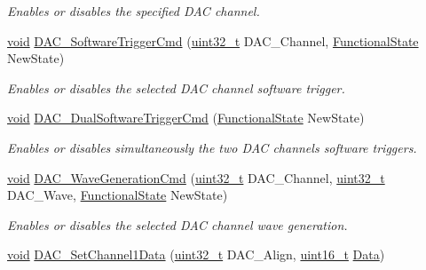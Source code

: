 \begin{DoxyCompactItemize}
\begin{DoxyCompactList}\small\item\em Enables or disables the specified D\-A\-C channel. \end{DoxyCompactList}\item 
\hyperlink{group___n_a_m_e_ga18028b8badbf1ea7e704ccac3c488e82}{void} \hyperlink{group___d_a_c___group1_ga46f9f7f6b9520a86e300fe966afe5fb3}{D\-A\-C\-\_\-\-Software\-Trigger\-Cmd} (\hyperlink{stdint_8h_a435d1572bf3f880d55459d9805097f62}{uint32\-\_\-t} D\-A\-C\-\_\-\-Channel, \hyperlink{group___exported__types_gac9a7e9a35d2513ec15c3b537aaa4fba1}{Functional\-State} New\-State)
\begin{DoxyCompactList}\small\item\em Enables or disables the selected D\-A\-C channel software trigger. \end{DoxyCompactList}\item 
\hyperlink{group___n_a_m_e_ga18028b8badbf1ea7e704ccac3c488e82}{void} \hyperlink{group___d_a_c___group1_gab4d3b364a6b184dcd65f3b294ebf56dc}{D\-A\-C\-\_\-\-Dual\-Software\-Trigger\-Cmd} (\hyperlink{group___exported__types_gac9a7e9a35d2513ec15c3b537aaa4fba1}{Functional\-State} New\-State)
\begin{DoxyCompactList}\small\item\em Enables or disables simultaneously the two D\-A\-C channels software triggers. \end{DoxyCompactList}\item 
\hyperlink{group___n_a_m_e_ga18028b8badbf1ea7e704ccac3c488e82}{void} \hyperlink{group___d_a_c___group1_gabd51ae6880821d4dcd923969ec19a19e}{D\-A\-C\-\_\-\-Wave\-Generation\-Cmd} (\hyperlink{stdint_8h_a435d1572bf3f880d55459d9805097f62}{uint32\-\_\-t} D\-A\-C\-\_\-\-Channel, \hyperlink{stdint_8h_a435d1572bf3f880d55459d9805097f62}{uint32\-\_\-t} D\-A\-C\-\_\-\-Wave, \hyperlink{group___exported__types_gac9a7e9a35d2513ec15c3b537aaa4fba1}{Functional\-State} New\-State)
\begin{DoxyCompactList}\small\item\em Enables or disables the selected D\-A\-C channel wave generation. \end{DoxyCompactList}\item 
\hyperlink{group___n_a_m_e_ga18028b8badbf1ea7e704ccac3c488e82}{void} \hyperlink{group___d_a_c___group1_gad06b4230d2b17d1d13f41dce4c782461}{D\-A\-C\-\_\-\-Set\-Channel1\-Data} (\hyperlink{stdint_8h_a435d1572bf3f880d55459d9805097f62}{uint32\-\_\-t} D\-A\-C\-\_\-\-Align, \hyperlink{stdint_8h_a273cf69d639a59973b6019625df33e30}{uint16\-\_\-t} \hyperlink{group___copter_control_b_l_ga6f3335509cc4943e20df66f72483910c}{Data})

\end{DoxyCompactItemize}
